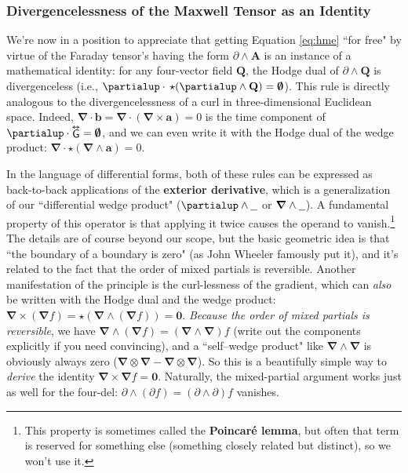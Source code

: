 \documentclass[12pt]{article}
\renewcommand{\vv}[1]{\mathbf{#1}}
\newcommand{\del}{\boldsymbol{\nabla}}
\newcommand{\tightoverset}[2]{%
  \mathop{#2}\limits^{\vbox to -.5ex{\kern-0.75ex\hbox{$#1$}\vss}}}
\newcommand{\inlinedy}[1]{\tightoverset{\text{\tiny$\bm\leftrightarrow$}}{#1}}
\begin{document}
\subsubsection{Divergencelessness of the Maxwell Tensor as an Identity}\label{sssec:dedv}

We're now in a position to appreciate that getting Equation \ref{eq:hme} ``for free" by virtue of the Faraday tensor's having the form $\partialup \wedge \vv A$ is an instance of a mathematical identity: for any four-vector field $\vv Q$, the Hodge dual of $\partialup \wedge \vv Q$ is divergenceless (i.e., $\partialup \cdot \, \star ( \partialup \wedge \vv Q ) = \textrm{\mbox{\boldmath $\emptyset$}}$). This rule is directly analogous to the divergencelessness of a curl in three-dimensional Euclidean space. Indeed, $\del \cdot \vv b = \del \cdot ( \del \times \vv a ) = 0$ is the time component of $\partialup \cdot \inlinedy{\mathsf{G}} = \textrm{\mbox{\boldmath $\emptyset$}}$, and we can even write it with the Hodge dual of the wedge product: $\del \cdot \star ( \del \wedge \vv a ) = 0$.

In the language of differential forms, both of these rules can be expressed as back-to-back applications of the \textbf{exterior derivative}, which is a generalization of our ``differential wedge product" ($\partialup \wedge \text{\underline{\hspace{.6em}}}$ or $\del \wedge \text{\underline{\hspace{.6em}}}$). A fundamental property of this operator is that applying it twice causes the operand to vanish.\footnote{This property is sometimes called the \textbf{Poincar\'e lemma}, but often that term is reserved for something else (something closely related but distinct), so we won't use it.} The details are of course beyond our scope, but the basic geometric idea is that ``the boundary of a boundary is zero" (as John Wheeler famously put it), and it's related to the fact that the order of mixed partials is reversible. Another manifestation of the principle is the curl-lessness of the gradient, which can \emph{also} be written with the Hodge dual and the wedge product: $\del \times ( \del f ) = \star ( \del \wedge ( \del f ) ) = \vv 0 $. \emph{Because the order of mixed partials is reversible}, we have $\del \wedge ( \del f ) = ( \del \wedge \del ) f$ (write out the components explicitly if you need convincing), and a ``self--wedge product" like $ \del \wedge \del $ is obviously always zero ($\del \otimes \del - \del \otimes \del$). So this is a beautifully simple way to \emph{derive} the identity ${ \del \times \del f = \vv 0 }$. Naturally, the mixed-partial argument works just as well for the four-del: ${ \partialup \wedge ( \partialup f ) = ( \partialup \wedge \partialup ) f }$ vanishes.
\end{document}
